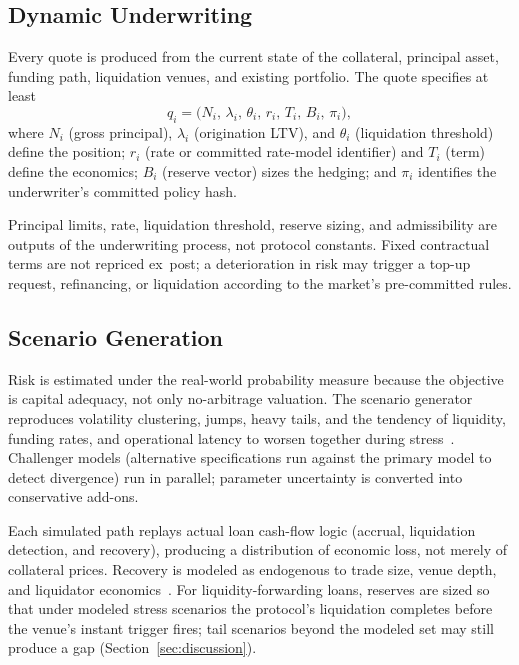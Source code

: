 \subsection{Dynamic Underwriting}

Every quote is produced from the current state of the collateral, principal asset, funding path, liquidation venues, and existing portfolio. The quote specifies at least
\begin{equation}
  q_i = \bigl(N_i,\, \lambda_i,\, \theta_i,\, r_i,\, T_i,\, B_i,\, \pi_i\bigr),
  \label{eq:quote}
\end{equation}
where $N_i$ (gross principal), $\lambda_i$ (origination LTV), and $\theta_i$ (liquidation threshold) define the position; $r_i$ (rate or committed rate-model identifier) and $T_i$ (term) define the economics; $B_i$ (reserve vector) sizes the hedging; and $\pi_i$ identifies the underwriter's committed policy hash.

Principal limits, rate, liquidation threshold, reserve sizing, and admissibility are outputs of the underwriting process, not protocol constants. Fixed contractual terms are not repriced ex~post; a deterioration in risk may trigger a top-up request, refinancing, or liquidation according to the market's pre-committed rules.

\subsection{Scenario Generation}

Risk is estimated under the real-world probability measure because the objective is capital adequacy, not only no-arbitrage valuation. The scenario generator reproduces volatility clustering, jumps, heavy tails, and the tendency of liquidity, funding rates, and operational latency to worsen together during stress~\cite{castro2021,chiu2023,gudgeon2020,heimbach2023,tovanich2023}. Challenger models (alternative specifications run against the primary model to detect divergence) run in parallel; parameter uncertainty is converted into conservative add-ons.

Each simulated path replays actual loan cash-flow logic (accrual, liquidation detection, and recovery), producing a distribution of economic loss, not merely of collateral prices. Recovery is modeled as endogenous to trade size, venue depth, and liquidator economics~\cite{perez2021,qin2021,sadeghi2026,tian2025}. For liquidity-forwarding loans, reserves are sized so that under modeled stress scenarios the protocol's liquidation completes before the venue's instant trigger fires; tail scenarios beyond the modeled set may still produce a gap (Section~\ref{sec:discussion}).

